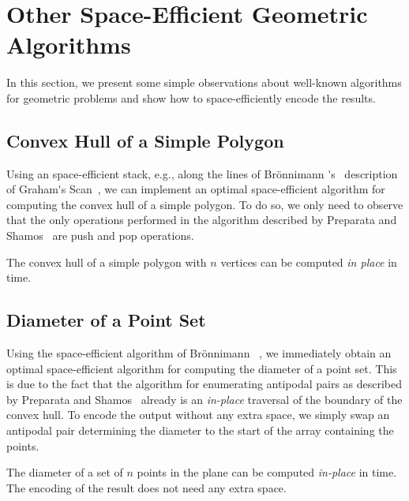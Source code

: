 
\section{Other Space-Efficient Geometric Algorithms}

In this section, we present some simple observations about well-known
algorithms for geometric problems and show how to space-efficiently
encode the results.

\subsection{Convex Hull of a Simple Polygon}

Using an space-efficient stack, e.g., along the lines of Br\"onnimann
\etal\'{}s~\cite{bronnimann:convex} description of Graham\'{}s
Scan~\cite{graham:efficient}, we can implement an optimal
space-efficient algorithm for computing the convex hull of a simple
polygon. To do so, we only need to observe that the only operations
performed in the algorithm described by Preparata and
Shamos~\cite[Chap. 4.1.4]{preparata:computational} are push and pop
operations.

\begin{lemma}
  The convex hull of a simple polygon with $n$ vertices can
  be computed \emph{in place} in  time.
\end{lemma}

\subsection{Diameter of a Point Set}

Using the space-efficient algorithm of Br\"onnimann
\etal~\cite{bronnimann:convex}, we immediately obtain an optimal
space-efficient algorithm for computing the diameter of a point set.
This is due to the fact that the algorithm for enumerating antipodal
pairs as described by Preparata and Shamos~\cite[Chap.
4.2.3]{preparata:computational} already is an \emph{in-place}
traversal of the boundary of the convex hull. To encode the output
without any extra space, we simply swap an antipodal pair determining
the diameter to the start of the array containing the points.

\begin{lemma}
  The diameter of a set of $n$ points in the plane can be computed
  \emph{in-place} in  time. The encoding of the result
  does not need any extra space.
\end{lemma}

